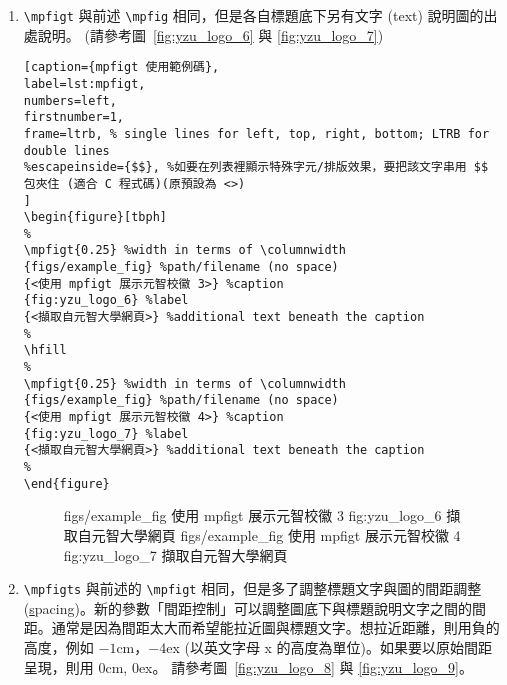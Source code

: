 \begin{enumerate}
\item \verb+\mpfigt+ 與前述 \verb+\mpfig+ 相同，但是各自標題底下另有文字 (text) 說明圖的出處說明。 (請參考圖~\ref{fig:yzu_logo_6} 與 \ref{fig:yzu_logo_7})

{\centering\begin{lstlisting}[caption={mpfigt 使用範例碼},
label=lst:mpfigt,
numbers=left,
firstnumber=1,
frame=ltrb, % single lines for left, top, right, bottom; LTRB for double lines 
%escapeinside={$$}, %如要在列表裡顯示特殊字元/排版效果，要把該文字串用 $$ 包夾住 (適合 C 程式碼)(原預設為 <>)
]
\begin{figure}[tbph]
%
\mpfigt{0.25} %width in terms of \columnwidth
{figs/example_fig} %path/filename (no space)
{<使用 mpfigt 展示元智校徽 3>} %caption
{fig:yzu_logo_6} %label
{<擷取自元智大學網頁>} %additional text beneath the caption
%
\hfill
%
\mpfigt{0.25} %width in terms of \columnwidth
{figs/example_fig} %path/filename (no space)
{<使用 mpfigt 展示元智校徽 4>} %caption
{fig:yzu_logo_7} %label
{<擷取自元智大學網頁>} %additional text beneath the caption
%
\end{figure}
\end{lstlisting}\par}

%
\begin{figure}[tbph]
%
{figs/example_fig} %
{使用 mpfigt 展示元智校徽 3} %
{fig:yzu_logo_6} %
{擷取自元智大學網頁} %
%
\hfill
%
{figs/example_fig} %
{使用 mpfigt 展示元智校徽 4} %
{fig:yzu_logo_7} %
{擷取自元智大學網頁} %
%
\end{figure}

\item \verb+\mpfigts+ 與前述的 \verb+\mpfigt+ 相同，但是多了調整標題文字與圖的間距調整 (\uline{s}pacing)。新的參數「間距控制」可以調整圖底下與標題說明文字之間的間距。通常是因為間距太大而希望能拉近圖與標題文字。想拉近距離，則用負的高度，例如 $-1$cm，$-4$ex (以英文字母 x 的高度為單位)。如果要以原始間距呈現，則用 0cm, 0ex。
請參考圖~\ref{fig:yzu_logo_8} 與 \ref{fig:yzu_logo_9}。


\end{enumerate}
